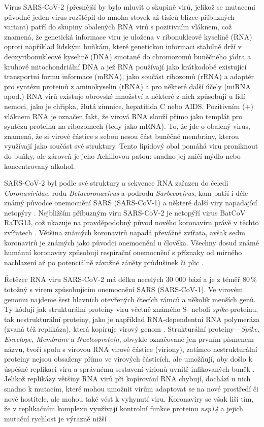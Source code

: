 Virus SARS-CoV-2 (přesnější by bylo mluvit o skupině virů, jelikož se mutacemi původně jeden virus rozštěpil do mnoha stovek až tisíců blízce příbuzných variant) patří do skupiny obalených RNA virů s pozitivním vláknem, což znamená, že genetická informace viru je uložena v ribonukleové kyselině (RNA) oproti například lidským buňkám, které genetickou informaci stabilně drží v deoxyribonukleové kyselině (DNA) smotané do chromozomů buněčného jádra a kruhové mitochondriální DNA a jež RNA používají jako krátkodobě existující transportní formu informace (mRNA), jako součást ribozomů (rRNA) a adaptér pro syntézu proteinů z aminokyselin (tRNA) a pro některé další účely (miRNA apod.) RNA virů existuje obrovské množství a některé z nich způsobují u lidí nemoci, jako je chřipka, žlutá zimnice, hepatitida C nebo AIDS. Pozitivním (+) vláknem RNA je označen fakt, že virová RNA slouží přímo jako templát pro syntézu proteinů na ribozomech (tedy jako mRNA). To, že jde o obalený virus, znamená, že si virové částice s sebou nesou část buněčné membrány, kterou využívají jako součást své struktury. Tento lipidový obal pomáhá viru proniknout do buňky, ale zároveň je jeho Achillovou patou: snadno jej zničí mýdlo nebo koncentrovaný alkohol.

SARS-CoV-2 byl podle své struktury a sekvence RNA zařazen do čeledi \textit{Coronaviridae}, rodu \textit{Betacoronavirus} a podrodu \textit{Sarbecovirus}, kam patří i déle známý původce onemocnění SARS (SARS-CoV-1) a některé další viry napadající netopýry \cite{Zhou:2020,Lu:2020a}. Nejbližším příbuzným viru SARS-CoV-2 je netopýří virus BatCoV RaTG13, což ukazuje na pravděpodobný původ nového koronaviru právě v těchto zvířatech \cite{Chan:2020,Hu:2021}. Většina známých koronavirů napadá převážně zvířata, avšak sedm koronavirů je známých jako původci onemocnění u člověka. Všechny dosud známé humánní koronaviry způsobují respirační onemocnění s příznaky od mírného nachlazení až po potenciálně závažné záněty průdušinek či plic \cite{Wevers:2009}.

Řetězec RNA viru SARS-CoV-2 má délku necelých 30 000 bází a je z téměř 80\,\% totožný s virem způsobujícím onemocnění SARS (SARS-CoV-1). Ve virovém genomu najdeme šest hlavních otevřených čtecích rámců a několik menších genů. Ty kódují jak strukturální proteiny viru včetně známého S- neboli \textit{spike}-proteinu, tak nestrukturální proteiny, jako je například RNA-dependentní RNA polymeráza (zvaná též replikáza), která kopíruje virový genom \cite{Chan:2020}. Strukturální proteiny---\textit{Spike, Envelope, Membrane} a \textit{Nucleoprotein}, obvykle označované jen prvním písmenem názvu, tvoří spolu s virovou RNA virové částice (viriony), zatímco nestrukturální proteiny nejsou obsaženy přímo ve virových částicích, ale umožňují, aby došlo k úspěšné replikaci viru a správnému sestavení virionů uvnitř infikovaných buněk \cite{Mittal:2020}. Jelikož replikázy většiny RNA virů při kopírování RNA chybují, dochází u nich snadno k mutacím, které mohou umožnit virům adaptovat se na nové prostředí či nové hostitele, ale mohou také vést k vyhynutí viru. Koronaviry se však liší tím, že v replikačním komplexu využívají kontrolní funkce proteinu \textit{nsp14} a jejich mutační rychlost je výrazně nižší \cite{Robson:2020}.

